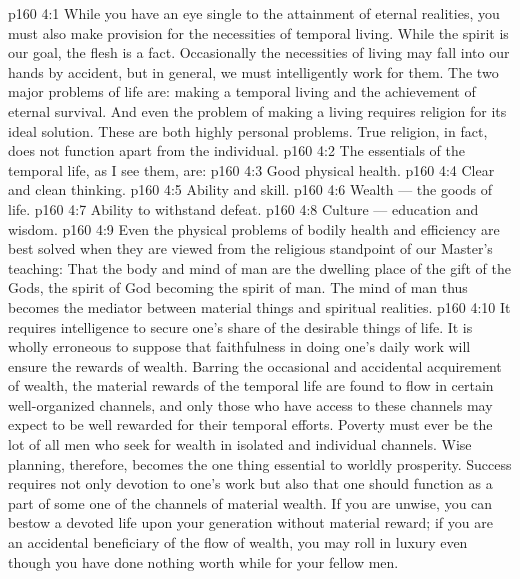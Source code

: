 \vs p160 4:1 While you have an eye single to the attainment of eternal realities, you must also make provision for the necessities of temporal living. While the spirit is our goal, the flesh is a fact. Occasionally the necessities of living may fall into our hands by accident, but in general, we must intelligently work for them. The two major problems of life are: making a temporal living and the achievement of eternal survival. And even the problem of making a living requires religion for its ideal solution. These are both highly personal problems. True religion, in fact, does not function apart from the individual.
\vs p160 4:2 \pc The essentials of the temporal life, as I see them, are:
\vs p160 4:3 \bibnobreakspace Good physical health.
\vs p160 4:4 \bibnobreakspace Clear and clean thinking.
\vs p160 4:5 \bibnobreakspace Ability and skill.
\vs p160 4:6 \bibnobreakspace Wealth --- the goods of life.
\vs p160 4:7 \bibnobreakspace Ability to withstand defeat.
\vs p160 4:8 \bibnobreakspace Culture --- education and wisdom.
\vs p160 4:9 \pc Even the physical problems of bodily health and efficiency are best solved when they are viewed from the religious standpoint of our Master’s teaching: That the body and mind of man are the dwelling place of the gift of the Gods, the spirit of God becoming the spirit of man. The mind of man thus becomes the mediator between material things and spiritual realities.
\vs p160 4:10 \pc It requires intelligence to secure one’s share of the desirable things of life. It is wholly erroneous to suppose that faithfulness in doing one’s daily work will ensure the rewards of wealth. Barring the occasional and accidental acquirement of wealth, the material rewards of the temporal life are found to flow in certain well\hyp{}organized channels, and only those who have access to these channels may expect to be well rewarded for their temporal efforts. Poverty must ever be the lot of all men who seek for wealth in isolated and individual channels. Wise planning, therefore, becomes the one thing essential to worldly prosperity. Success requires not only devotion to one’s work but also that one should function as a part of some one of the channels of material wealth. If you are unwise, you can bestow a devoted life upon your generation without material reward; if you are an accidental beneficiary of the flow of wealth, you may roll in luxury even though you have done nothing worth while for your fellow men.
